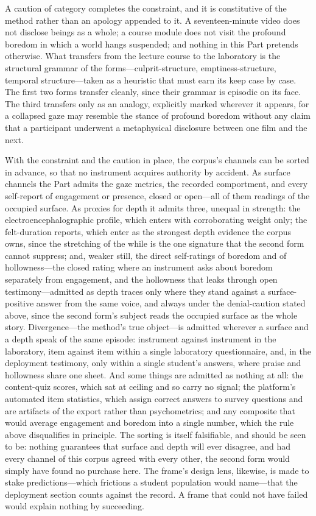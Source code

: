 A caution of category completes the constraint, and it is constitutive of the method rather than an apology appended to it. A seventeen-minute video does not disclose beings as a whole; a course module does not visit the profound boredom in which a world hangs suspended; and nothing in this Part pretends otherwise. What transfers from the lecture course to the laboratory is the structural grammar of the forms---culprit-structure, emptiness-structure, temporal structure---taken as a heuristic that must earn its keep case by case. The first two forms transfer cleanly, since their grammar is episodic on its face. The third transfers only as an analogy, explicitly marked wherever it appears, for a collapsed gaze may resemble the stance of profound boredom without any claim that a participant underwent a metaphysical disclosure between one film and the next.

With the constraint and the caution in place, the corpus's channels can be sorted in advance, so that no instrument acquires authority by accident. As surface channels the Part admits the gaze metrics, the recorded comportment, and every self-report of engagement or presence, closed or open---all of them readings of the occupied surface. As proxies for depth it admits three, unequal in strength: the electroencephalographic profile, which enters with corroborating weight only; the felt-duration reports, which enter as the strongest depth evidence the corpus owns, since the stretching of the while is the one signature that the second form cannot suppress; and, weaker still, the direct self-ratings of boredom and of hollowness---the closed rating where an instrument asks about boredom separately from engagement, and the hollowness that leaks through open testimony---admitted as depth traces only where they stand against a surface-positive answer from the same voice, and always under the denial-caution stated above, since the second form's subject reads the occupied surface as the whole story. Divergence---the method's true object---is admitted wherever a surface and a depth speak of the same episode: instrument against instrument in the laboratory, item against item within a single laboratory questionnaire, and, in the deployment testimony, only within a single student's answers, where praise and hollowness share one sheet. And some things are admitted as nothing at all: the content-quiz scores, which sat at ceiling and so carry no signal; the platform's automated item statistics, which assign correct answers to survey questions and are artifacts of the export rather than psychometrics; and any composite that would average engagement and boredom into a single number, which the rule above disqualifies in principle. The sorting is itself falsifiable, and should be seen to be: nothing guarantees that surface and depth will ever disagree, and had every channel of this corpus agreed with every other, the second form would simply have found no purchase here. The frame's design lens, likewise, is made to stake predictions---which frictions a student population would name---that the deployment section counts against the record. A frame that could not have failed would explain nothing by succeeding.

